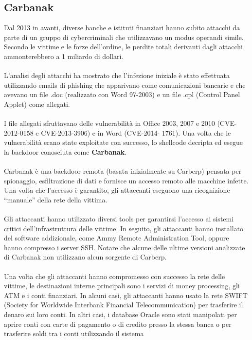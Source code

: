 \documentclass{article}
\begin{document}
\subsection{Carbanak}
\noindent
Dal 2013 in avanti, diverse banche e istituti finanziari hanno subito attacchi da parte di un gruppo 
di cybercriminali che utilizzavano un modus operandi simile. Secondo le vittime e le forze dell’ordine, 
le perdite totali derivanti dagli attacchi ammonterebbero a 1 miliardo di dollari. \\\\
L’analisi degli attacchi ha mostrato che l’infezione iniziale è stato effettuata utilizzando emails di 
phishing che apparivano come comunicazioni bancarie e che avevano un file .doc (realizzato con Word 97-2003) 
e un file .cpl (Control Panel Applet) come allegati.\\\\
I file allegati sfruttavano delle vulnerabilità in Office 2003, 2007 e 2010 (CVE-2012-0158 e CVE-2013-3906) 
e in Word (CVE-2014- 1761). Una volta che le vulnerabilità erano state exploitate con successo, lo 
shellcode decripta ed esegue la backdoor conosciuta come \textbf{Carbanak}.\\\\
Carbanak è una backdoor remota (basata inizialmente su Carberp) pensata per spionaggio, esfiltrazione 
di dati e fornisce un accesso remoto alle macchine infette. Una volta che l’accesso è garantito, gli 
attaccanti eseguono una ricognizione “manuale” della rete della vittima.\\\\
Gli attaccanti hanno utilizzato diversi tools per garantirsi l’accesso ai sistemi critici 
dell’infrastruttura delle vittime. In seguito, gli attaccanti hanno installato del software addizionale, 
come Ammy Remote Administration Tool, oppure hanno compresso i server SSH. Notare che alcune delle ultime 
versioni analizzate di Carbanak non utilizzano alcun sorgente di Carberp.\\\\
Una volta che gli attaccanti hanno compromesso con successo la rete delle vittime, le destinazioni interne 
principali sono i servizi di money processing, gli ATM e i conti finanziari. In alcuni casi, gli attaccanti 
hanno usato la rete SWIFT (Society for Worldwide Interbank Financial Telecommunication) per trasferire il 
denaro sui loro conti. In altri casi, i database Oracle sono stati manipolati per aprire conti con carte 
di pagamento o di credito presso la stessa banca o per trasferire soldi tra i conti utilizzando il sistema 
\end{document}
